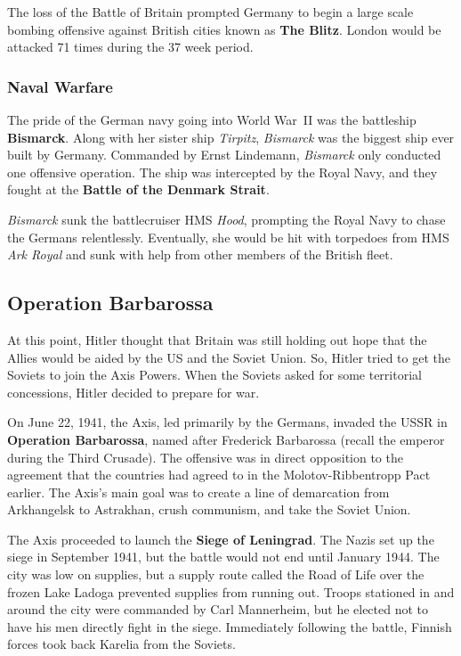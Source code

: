 The loss of the Battle of Britain prompted Germany
to begin a large scale bombing offensive against British cities
known as \textbf{The Blitz}.
London would be attacked 71 times during the 37 week period.

\subsubsection*{Naval Warfare}

The pride of the German navy going into World War~II was the battleship \textbf{Bismarck}.
Along with her sister ship \textit{Tirpitz},
\textit{Bismarck} was the biggest ship ever built by Germany.
Commanded by Ernst Lindemann, \textit{Bismarck} only conducted one offensive operation.
The ship was intercepted by the Royal Navy,
and they fought at the \textbf{Battle of the Denmark Strait}.

\textit{Bismarck} sunk the battlecruiser HMS \textit{Hood},
prompting the Royal Navy to chase the Germans relentlessly.
Eventually, she would be hit with torpedoes from HMS \textit{Ark Royal}
and sunk with help from other members of the British fleet.

\subsection*{Operation Barbarossa}

At this point, Hitler thought that Britain was still holding out hope
that the Allies would be aided by the US and the Soviet Union.
So, Hitler tried to get the Soviets to join the Axis Powers.
When the Soviets asked for some territorial concessions, Hitler decided to prepare for war.

On June 22, 1941, the Axis, led primarily by the Germans,
invaded the USSR in \textbf{Operation Barbarossa},
named after Frederick Barbarossa (recall the emperor during the Third Crusade).
The offensive was in direct opposition to the agreement
that the countries had agreed to in the Molotov-Ribbentropp Pact earlier.
The Axis's main goal was to create a line of demarcation from Arkhangelsk to Astrakhan,
crush communism, and take the Soviet Union.

The Axis proceeded to launch the \textbf{Siege of Leningrad}.
The Nazis set up the siege in September 1941, but the battle would not end until January 1944.
The city was low on supplies,
but a supply route called the Road of Life over the frozen Lake Ladoga
prevented supplies from running out.
Troops stationed in and around the city were commanded by Carl Mannerheim,
but he elected not to have his men directly fight in the siege.
Immediately following the battle, Finnish forces took back Karelia from the Soviets.


